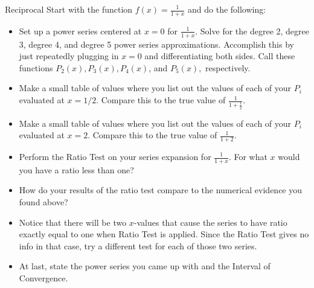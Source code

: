 \begin{exercise}{Reciprocal \Coffeecup \Coffeecup \Coffeecup}
Start with the function $f(x)=\frac{1}{1+x}$ and do the following:

\begin{itemize}
\item Set up a power series centered at $x=0$ for $\frac{1}{1+x}$.  Solve for the degree 2, degree 3, degree 4, and degree 5 power series approximations.  Accomplish this by just repeatedly plugging in $x=0$ and differentiating both sides.  Call these functions $P_2(x), P_3(x), P_4(x)$, and $P_5(x),$ respectively.
\item Make a small table of values where you list out the values of each of your $P_i$ evaluated at $x=1/2$.  Compare this to the true value of $\frac{1}{1+\frac{1}{2}}$.  
\item Make a small table of values where you list out the values of each of your $P_i$ evaluated at $x=2$.  Compare this to the true value of $\frac{1}{1+2}$.
\item Perform the Ratio Test on your series expansion for $\frac{1}{1+x}$.  For what $x$ would you have a ratio less than one?
\item How do your results of the ratio test compare to the numerical evidence you found above?
\item Notice that there will be two $x$-values that cause the series to have ratio exactly equal to one when Ratio Test is applied.  Since the Ratio Test gives no info in that case, try a different test for each of those two series.  
\item At last, state the power series you came up with and the Interval of Convergence.
\end{itemize}
\end{exercise}
